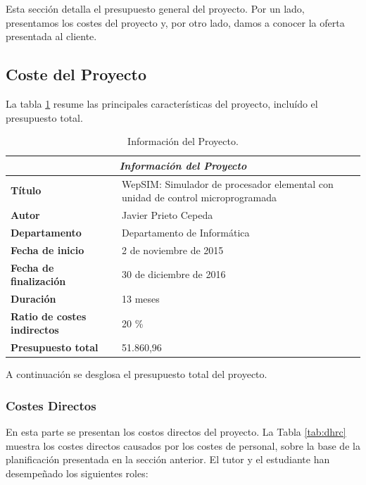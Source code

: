 Esta sección detalla el presupuesto general del proyecto. Por un lado, presentamos los costes del proyecto y, por otro lado, damos a conocer la oferta presentada al cliente.

\subsection{Coste del Proyecto}

La tabla \ref{tab:project_information} resume las principales características del proyecto, incluído el presupuesto total.

\begin{center}
\begin{table}[htbp]
\centering
\begin{tabular}{@{}p{3.5cm} p{9cm}@{}} 
\toprule
\multicolumn{2}{c}{\textbf{\textit{Información del Proyecto}}}\\
\midrule
\textbf{Título} 					& WepSIM: Simulador de procesador elemental con unidad de control microprogramada \\
\midrule
\textbf{Autor} 					& Javier Prieto Cepeda \\
\midrule
\textbf{Departamento} 				& Departamento de Informática \\
\midrule
\textbf{Fecha de inicio}				&2 de noviembre de 2015 \\
\midrule
\textbf{Fecha de finalización}				& 30 de diciembre de 2016 \\
\midrule
\textbf{Duración} 				& 13 meses \\
\midrule
\textbf{Ratio de costes indirectos} 	& 20 \% \\
\midrule
\textbf{Presupuesto total} 			& 51.860,96 \\
\bottomrule
\end{tabular}
\caption{Información del Proyecto.}
\label{tab:project_information}
\end{table}
\end{center}

\vspace{5cm}

A continuación se desglosa el presupuesto total del proyecto.

\subsubsection{Costes Directos}

En esta parte se presentan los costos directos del proyecto. La Tabla \ref{tab:dhrc} muestra los costes directos causados por los costes de personal, sobre la base de la planificación presentada en la sección anterior. El tutor y el estudiante han desempeñado los siguientes roles:

